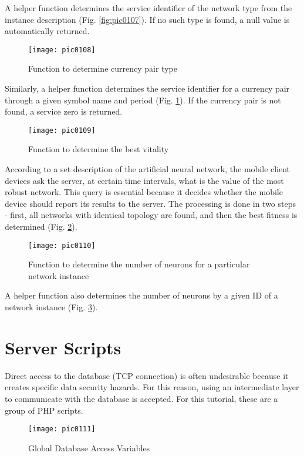 A helper function determines the service identifier of the network type from the instance description (Fig. \ref{fig:pic0107}). If no such type is found, a null value is automatically returned.

\begin{figure}[h]
\centering
\texttt{[image: pic0108]}
\caption{Function to determine currency pair type}
\label{fig:pic0108}
\end{figure}
\FloatBarrier

Similarly, a helper function determines the service identifier for a currency pair through a given symbol name and period (Fig. \ref{fig:pic0108}). If the currency pair is not found, a service zero is returned.

\begin{figure}[h]
\centering
\texttt{[image: pic0109]}
\caption{Function to determine the best vitality}
\label{fig:pic0109}
\end{figure}
\FloatBarrier

According to a set description of the artificial neural network, the mobile client devices ask the server, at certain time intervals, what is the value of the most robust network. This query is essential because it decides whether the mobile device should report its results to the server. The processing is done in two steps - first, all networks with identical topology are found, and then the best fitness is determined (Fig. \ref{fig:pic0109}).

\begin{figure}[h]
\centering
\texttt{[image: pic0110]}
\caption{Function to determine the number of neurons for a particular network instance}
\label{fig:pic0110}
\end{figure}
\FloatBarrier

A helper function also determines the number of neurons by a given ID of a network instance (Fig. \ref{fig:pic0110}).

\section{Server Scripts}

Direct access to the database (TCP connection) is often undesirable because it creates specific data security hazards. For this reason, using an intermediate layer to communicate with the database is accepted. For this tutorial, these are a group of PHP scripts.

\begin{figure}[h]
\centering
\texttt{[image: pic0111]}
\caption{Global Database Access Variables}
\label{fig:pic0111}
\end{figure}
\FloatBarrier


